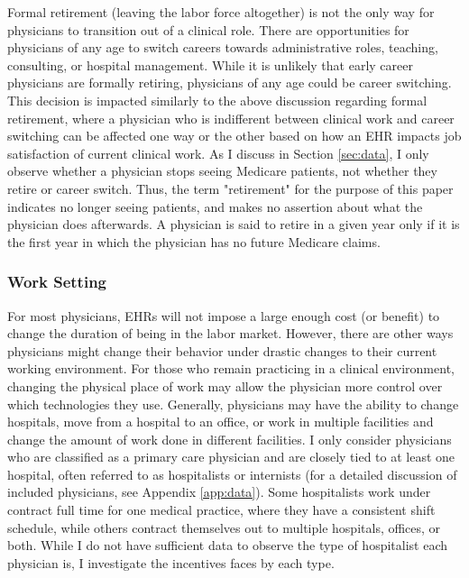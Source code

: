 \documentclass[12pt]{article}
\begin{document}
Formal retirement (leaving the labor force altogether) is not the only way for physicians to transition out of a clinical role. There are opportunities for physicians of any age to switch careers towards administrative roles, teaching, consulting, or hospital management. While it is unlikely that early career physicians are formally retiring, physicians of any age could be career switching. This decision is impacted similarly to the above discussion regarding formal retirement, where a physician who is indifferent between clinical work and career switching can be affected one way or the other based on how an EHR impacts job satisfaction of current clinical work. As I discuss in Section \ref{sec:data}, I only observe whether a physician stops seeing Medicare patients, not whether they retire or career switch. Thus, the term "retirement" for the purpose of this paper indicates no longer seeing patients, and makes no assertion about what the physician does afterwards. A physician is said to retire in a given year only if it is the first year in which the physician has no future Medicare claims.



\subsubsection{Work Setting}

For most physicians, EHRs will not impose a large enough cost (or benefit) to change the duration of being in the labor market. However, there are other ways physicians might change their behavior under drastic changes to their current working environment. For those who remain practicing in a clinical environment, changing the physical place of work may allow the physician more control over which technologies they use. Generally, physicians may have the ability to change hospitals, move from a hospital to an office, or work in multiple facilities and change the amount of work done in different facilities. I only consider physicians who are classified as a primary care physician and are closely tied to at least one hospital, often referred to as hospitalists or internists (for a detailed discussion of included physicians, see Appendix \ref{app:data}). Some hospitalists work under contract full time for one medical practice, where they have a consistent shift schedule, while others contract themselves out to multiple hospitals, offices, or both. While I do not have sufficient data to observe the type of hospitalist each physician is, I investigate the incentives faces by each type.
\end{document}
